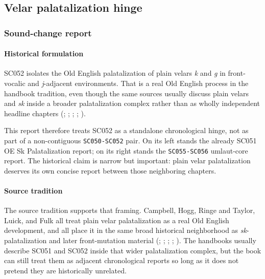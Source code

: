 \documentclass[
  british,
  a4paper,
]{article}
\begin{document}
\subsection{Velar palatalization
hinge}\label{velar-palatalization-hinge}

\subsubsection{Sound-change report}\label{sound-change-report-32}

\paragraph{Historical formulation}\label{historical-formulation-32}

SC052 isolates the Old English palatalization of plain velars \emph{k}
and \emph{g} in front-vocalic and \emph{j}-adjacent environments. That
is a real Old English process in the handbook tradition, even though the
same sources usually discuss plain velars and \emph{sk} inside a broader
palatalization complex rather than as wholly independent headline
chapters (;
;
;
;
).

This report therefore treats SC052 as a standalone chronological hinge,
not as part of a non-contiguous \texttt{SC050-SC052} pair. On its left
stands the already SC051 OE Sk Palatalization report; on its right
stands the \texttt{SC055-SC056} umlaut-core report. The historical claim
is narrow but important: plain velar palatalization deserves its own
concise report between those neighboring chapters.

\paragraph{Source tradition}\label{source-tradition-32}

The source tradition supports that framing. Campbell, Hogg, Ringe and
Taylor, Luick, and Fulk all treat plain velar palatalization as a real
Old English development, and all place it in the same broad historical
neighborhood as \emph{sk}-palatalization and later front-mutation
material (;
;
; ; ). The handbooks usually describe SC051 and SC052 inside that wider
palatalization complex, but the book can still treat them as adjacent
chronological reports so long as it does not pretend they are
historically unrelated.
\end{document}
